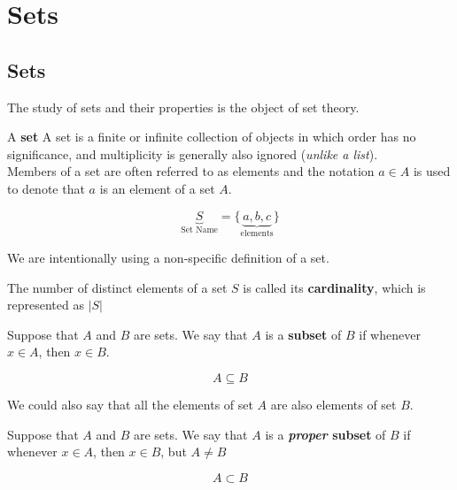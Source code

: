 \documentclass[20150903-160354-rs2.2-MarksMathNotebook.tex]{subfiles}
\begin{document}
%
%


\chapter{Sets}

\section{Sets}

The study of sets and their properties is the object of set theory.


\begin{definition}[Set]
A \textbf{set} A set is a finite or infinite collection of objects in which order has no significance, and multiplicity is generally also ignored (\textit{unlike a list}).\\

Members of a set are often referred to as elements and the notation $a \in A$ is used to denote that $a$ is an element of a set $A$.
\end{definition}

\[
\underbrace{S}_{\text{Set Name}}=\{\underbrace{a, b, c}_{\text{elements}}\}
\]

\begin{remark}
We are intentionally using a non-specific definition of a set.
\end{remark}

\begin{definition}[Cardinality]
The number of distinct elements of a set \(S\) is called its \textbf{cardinality}, which is represented as \(\left|S\right|\)
\end{definition}


\begin{definition}[Subset]
Suppose that $A$ and $B$ are sets.  We say that $A$ is a \textbf{subset} of $B$ if whenever $x \in A$, then $x \in B$.

\[
A \subseteq B
\]

We could also say that all the elements of set $A$ are also elements of set $B$.
\end{definition}

\begin{definition}
Suppose that $A$ and $B$ are sets.  We say that $A$ is a \textbf{\textit{proper} subset} of $B$ if whenever $x \in A$, then $x \in B$, but $A \ne B$

\[
A \subset B
\]

\end{definition}
\end{document}
